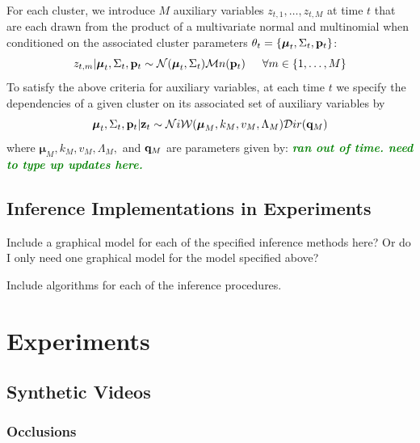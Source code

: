 \documentclass{article}
\newcommand{\willie}[1]{\textcolor{green}{\textsf{\emph{\textbf{\textcolor{green}{#1}}}}}}
\begin{document}
For each cluster, we introduce $M$ auxiliary variables $z_{t, 1}, \ldots, z_{t, M}$ at time $t$ that are each drawn from the product of a multivariate normal and multinomial when conditioned on the associated cluster parameters $\theta_{t} = \{ \boldsymbol{\mu}_{t}, \Sigma_{t}, \bold{p}_{t} \}$:
\begin{equation}
z_{t, m} | \boldsymbol{\mu}_{t}, \Sigma_{t}, \bold{p}_{t}  \sim  \mathcal{N}(\boldsymbol{\mu}_{t}, \Sigma_{t}) \mathcal{M}n(\bold{p}_{t})   \hspace{15pt}   
\forall m \in \{ 1, \ldots, M \}
\end{equation}
To satisfy the above criteria for auxiliary variables, at each time $t$ we specify the dependencies of a given cluster on its associated set of auxiliary variables by
\begin{equation}
\boldsymbol{\mu}_{t}, \Sigma_{t}, \bold{p}_{t} | \bold{z}_t  \sim  \mathcal{N}i\mathcal{W}(\boldsymbol{\mu}_{M}, k_{M}, v_{M}, \Lambda_{M})  \mathcal{D}ir(\bold{q}_{M})
\end{equation}
where $\boldsymbol{\mu}_{M}, k_{M}, v_{M}, \Lambda_{M},$ and $\bold{q}_{M}$ are parameters given by:
\willie{ran out of time. need to type up updates here.}




\subsection{Inference Implementations in Experiments}
%
Include a graphical model for each of the specified inference methods here? Or do I only need one graphical model for the model specified above?

Include algorithms for each of the inference procedures.










\section*{Experiments}





\subsection{Synthetic Videos}

\subsubsection{Occlusions}
\end{document}

